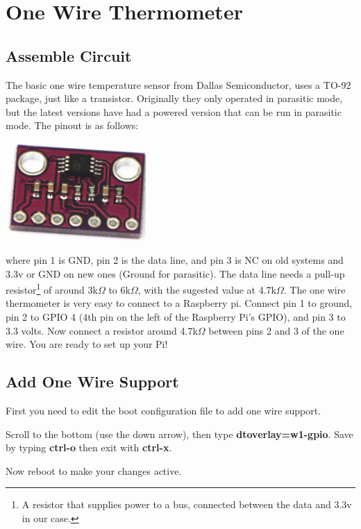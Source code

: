 \chapter{One Wire Thermometer}

\section{Assemble Circuit}

The basic one wire temperature sensor from Dallas Semiconductor, uses a TO-92 package, just like a transistor.  Originally they only operated in parasitic mode, but the latest versions have had a powered version that can be run in parasitic mode. The pinout is as follows:

\includegraphics[width=0.4\textwidth]{../images/InstAmpBreakoutBottom.jpg}

where pin 1 is GND, pin 2 is the data line, and pin 3 is NC on old systems and 3.3v or GND on new ones (Ground for parasitic).  The data line needs a pull-up resistor\footnote{A resistor that supplies power to a bus, connected between the data and 3.3v in our case.} of around 3k$\Omega$ to 6k$\Omega$, with the sugested value at 4.7k$\Omega$. The one wire thermometer is very easy to connect to a Raspberry pi.  Connect pin 1 to ground, pin 2 to GPIO 4 (4th pin on the left of the Raspberry Pi's GPIO), and pin 3 to 3.3 volts.  Now connect a resistor around 4.7k$\Omega$ between pins 2 and 3 of the one wire.  You are ready to set up your Pi!

\section{Add One Wire Support}

First you need to edit the boot configuration file to add one wire support.


Scroll to the bottom (use the down arrow), then type \textbf{dtoverlay=w1-gpio}.
Save by typing \textbf{ctrl-o} then exit with \textbf{ctrl-x}.

Now reboot to make your changes active.


